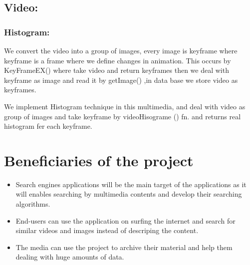 \vskip 0.3in
\subsection{Video: }
\subsubsection{Histogram:}
We convert the video into a group of images, every image is keyframe where keyframe is a frame where we define
 changes in animation. \linebreak This occurs by KeyFrameEX() where take video and return keyframes then we deal with 
 keyframe as image and read it by getImage() ,in data base we store video as keyframes. 

\vskip 0.2in
We implement Histogram technique in this multimedia, and deal with video as group of images and take keyframe by 
videoHisograme () fn. and returns real histogram fer each keyframe.




\section{Beneficiaries of the project}

\begin{itemize}
    \item Search engines applications will be the main target of the applications as it will enables searching by multimedia contents 
    and develop their searching algorithms.
    \item End-users can use the application on surfing the internet and search for similar videos and images instead of descriping the content.
    \item The media can use the project to archive their material and help them dealing with huge amounts of data.
\end{itemize}




